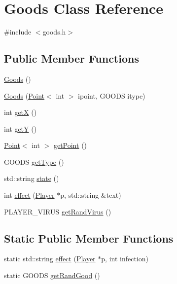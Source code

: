 \hypertarget{class_goods}{\section{Goods Class Reference}
\label{class_goods}
}


{\ttfamily \#include $<$goods.\-h$>$}

\subsection*{Public Member Functions}
\begin{DoxyCompactItemize}
\item 
\hyperlink{class_goods_a11ec1c9d1cf7df8c07419e3cbec4ccf3}{Goods} ()
\item 
\hyperlink{class_goods_a6107e093dffc503c9b490158b2c4931d}{Goods} (\hyperlink{class_point}{Point}$<$ int $>$ ipoint, G\-O\-O\-D\-S itype)
\item 
int \hyperlink{class_goods_a5e0062733281c329b74a33caa29843eb}{get\-X} ()
\item 
int \hyperlink{class_goods_a998939d13e143f6d0273c9f1033475b1}{get\-Y} ()
\item 
\hyperlink{class_point}{Point}$<$ int $>$ \hyperlink{class_goods_a4c8000347349db2880a9c3a117257985}{get\-Point} ()
\item 
G\-O\-O\-D\-S \hyperlink{class_goods_ab3e4db06673c19dbb824f31046ead735}{get\-Type} ()
\item 
std\-::string \hyperlink{class_goods_adcd12006e09bc2e1fa0248418f096cfb}{state} ()
\item 
int \hyperlink{class_goods_a68dcbdda6ea04ec570a07f87d773cf05}{effect} (\hyperlink{class_player}{Player} $\ast$p, std\-::string \&text)
\item 
P\-L\-A\-Y\-E\-R\-\_\-\-V\-I\-R\-U\-S \hyperlink{class_goods_aa0a58b7ee410f1a15e2ea50357fba1e1}{get\-Rand\-Virus} ()
\end{DoxyCompactItemize}
\subsection*{Static Public Member Functions}
\begin{DoxyCompactItemize}
\item 
static std\-::string \hyperlink{class_goods_a770112fe71f29a1f54ebb9dfdd498e74}{effect} (\hyperlink{class_player}{Player} $\ast$p, int infection)
\item 
static G\-O\-O\-D\-S \hyperlink{class_goods_a4860ca001ddd33cbfa4772dcf1376dcd}{get\-Rand\-Good} ()
\end{DoxyCompactItemize}


